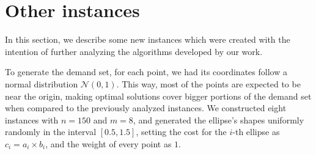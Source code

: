 \begin{table}
	\begin{center}
		\caption{Solutions of MCER-$k$ for instances AB061-AB120.}
		\label{tab:mcer-results-ab2}
	\end{center}
\end{table}

\section{Other instances}

In this section, we describe some new instances which were created with the intention of further analyzing the algorithms developed by our work.

To generate the demand set, for each point, we had its coordinates follow a normal distribution $\mathcal{N}(0, 1)$. This way, most of the points are expected to be near the origin, making optimal solutions cover bigger portions of the demand set when compared to the previously analyzed instances.
We constructed eight instances with $n=150$ and $m=8$, and generated the ellipse's shapes uniformly randomly in the interval $[0.5, 1.5]$, setting the cost for the $i$-th ellipse as $c_i=a_i\times b_i$, and the weight of every point as $1$.
